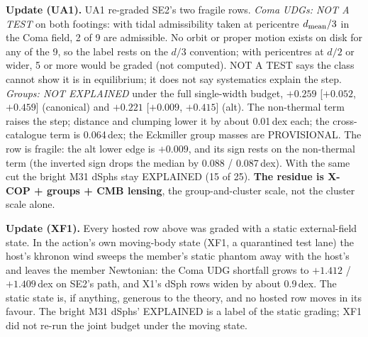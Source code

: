 \documentclass[10pt]{article}
\begin{document}
\textbf{Update (UA1).} UA1 re-graded SE2's two fragile rows. \emph{Coma UDGs: NOT A TEST} on both footings: with tidal admissibility taken at pericentre $d_{\rm mean}/3$ in the Coma field, 2 of 9 are admissible. No orbit or proper motion exists on disk for any of the 9, so the label rests on the $d/3$ convention; with pericentres at $d/2$ or wider, 5 or more would be graded (not computed). NOT A TEST says the class cannot show it is in equilibrium; it does not say systematics explain the step. \emph{Groups: NOT EXPLAINED} under the full single-width budget, $+0.259$ [$+0.052$, $+0.459$] (canonical) and $+0.221$ [$+0.009$, $+0.415$] (alt). The non-thermal term raises the step; distance and clumping lower it by about 0.01\,dex each; the cross-catalogue term is 0.064\,dex; the Eckmiller group masses are PROVISIONAL. The row is fragile: the alt lower edge is $+0.009$, and its sign rests on the non-thermal term (the inverted sign drops the median by 0.088 / 0.087\,dex). With the same cut the bright M31 dSphs stay EXPLAINED (15 of 25). \textbf{The residue is X-COP + groups + CMB lensing}, the group-and-cluster scale, not the cluster scale alone.

\textbf{Update (XF1).} Every hosted row above was graded with a static external-field state. In the action's own moving-body state (XF1, a quarantined test lane) the host's khronon wind sweeps the member's static phantom away with the host's and leaves the member Newtonian: the Coma UDG shortfall grows to $+1.412$ / $+1.409$\,dex on SE2's path, and X1's dSph rows widen by about 0.9\,dex. The static state is, if anything, generous to the theory, and no hosted row moves in its favour. The bright M31 dSphs' EXPLAINED is a label of the static grading; XF1 did not re-run the joint budget under the moving state.
\end{document}
